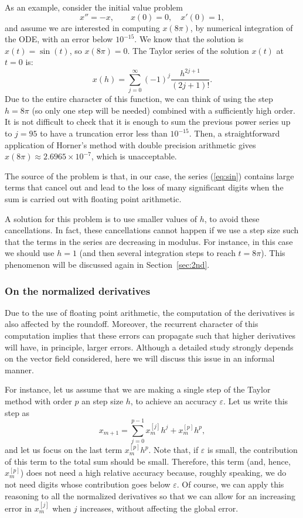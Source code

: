 \documentclass[12pt,twoside]{article}
\begin{document}
As an example, consider the initial value problem
\[
x''=-x,\qquad x(0)=0,\quad x'(0)=1,
\]
and assume we are interested in computing $x(8\pi)$, by numerical
integration of the ODE, with an error below $10^{-15}$. We know that
the solution is $x(t)=\sin(t)$, so $x(8\pi)=0$. The Taylor series of
the solution $x(t)$ at $t=0$ is:
\begin{equation}
x(h)=\sum_{j=0}^{\infty} (-1)^j\frac{h^{2j+1}}{(2j+1)!}.
\label{eq:sin}
\end{equation}
Due to the entire character of this function, we can think of using
the step $h=8\pi$ (so only one step will be needed) combined with a
sufficiently high order. It is not difficult to check that it is
enough to sum the previous power series up to $j=95$ to have a
truncation error less than $10^{-15}$. Then, a straightforward
application of Horner's method with double precision arithmetic gives
$x(8\pi)\approx 2.6965\times 10^{-7}$, which is unacceptable.

The source of the problem is that, in our case, the series
(\ref{eq:sin}) contains large terms that cancel out and lead to the
loss of many significant digits when the sum is carried out with
floating point arithmetic.

A solution for this problem is to use smaller values of $h$, to avoid
these cancellations. In fact, these cancellations cannot happen if we
use a step size such that the terms in the series are decreasing in
modulus. For instance, in this case we should use $h=1$ (and then
several integration steps to reach $t=8\pi$). This phenomenon will be
discussed again in Section~\ref{sec:2nd}.

\subsubsection{On the normalized derivatives}
Due to the use of floating point arithmetic, the computation of the
derivatives is also affected by the roundoff. Moreover, the recurrent
character of this computation implies that these errors can propagate
such that higher derivatives will have, in principle, larger errors.
Although a detailed study strongly depends on the vector field
considered, here we will discuss this issue in an informal manner.

For instance, let us assume that we are making a single step of the
Taylor method with order $p$ an step size $h$, to achieve an accuracy
$\varepsilon$. Let us write this step as
\[
x_{m+1}=\sum_{j=0}^{p-1} x_m^{[j]} h^j + x_m^{[p]} h^p,
\]
and let us focus on the last term $x_m^{[p]} h^p$. Note that, if
$\varepsilon$ is small, the contribution of this term to the total sum
should be small. Therefore, this term (and, hence, $x_m^{[p]}$) does
not need a high relative accuracy because, roughly speaking, we do not
need digits whose contribution goes below $\varepsilon$. Of course, we
can apply this reasoning to all the normalized derivatives so that we
can allow for an increasing error in $x_m^{[j]}$ when $j$ increases,
without affecting the global error.
\end{document}
